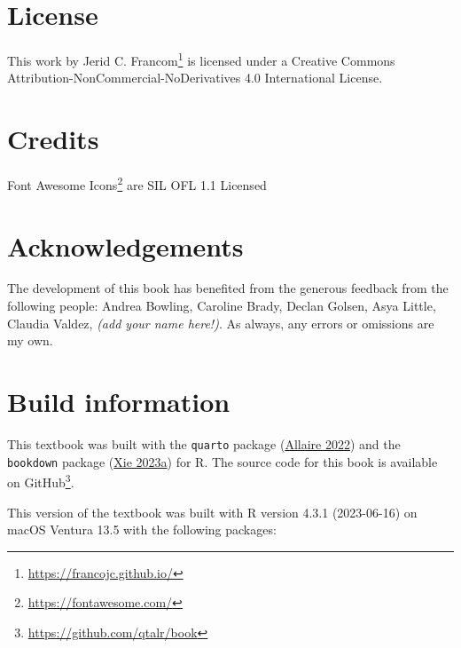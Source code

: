 \documentclass[
  letterpaper,
  DIV=11,
  numbers=noendperiod]{scrreport}
\theoremstyle{definition}
\theoremstyle{remark}
\DeclareRobustCommand{\href}[2]{#2\footnote{\url{#1}}}
\begin{document}
\hypertarget{license}{%
\section*{License}\label{license}}


This work by \href{https://francojc.github.io/}{Jerid C. Francom} is
licensed under a Creative Commons
Attribution-NonCommercial-NoDerivatives 4.0 International License.

\hypertarget{credits}{%
\section*{Credits}\label{credits}}


\href{https://fontawesome.com/}{Font Awesome Icons} are SIL OFL 1.1
Licensed

\hypertarget{acknowledgements}{%
\section*{Acknowledgements}\label{acknowledgements}}


The development of this book has benefited from the generous feedback
from the following people: Andrea Bowling, Caroline Brady, Declan
Golsen, Asya Little, Claudia Valdez, \emph{(add your name here!)}. As
always, any errors or omissions are my own.

\hypertarget{build-information}{%
\section*{Build information}\label{build-information}}


This textbook was built with the \texttt{quarto} package
(\protect\hyperlink{ref-R-quarto}{Allaire 2022}) and the
\texttt{bookdown} package (\protect\hyperlink{ref-R-bookdown}{Xie
2023a}) for R. The source code for this book is available on
\href{https://github.com/qtalr/book}{GitHub}.

This version of the textbook was built with R version 4.3.1 (2023-06-16)
on macOS Ventura 13.5 with the following packages:
\end{document}
